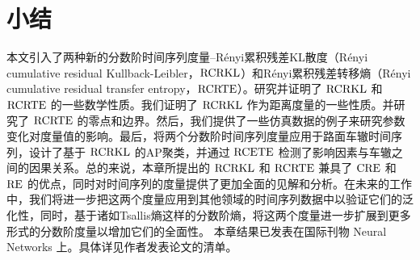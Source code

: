\section{小结} 
本文引入了两种新的分数阶时间序列度量--R\'{e}nyi累积残差KL散度（R\'{e}nyi cumulative residual Kullback-Leibler，$\rm{RCRKL}$）和R\'{e}nyi累积残差转移熵（R\'{e}nyi cumulative residual transfer entropy，$\rm{RCRTE}$）。研究并证明了 $\rm{RCRKL}$ 和 $\rm{RCRTE}$ 的一些数学性质。我们证明了 $\rm{RCRKL}$ 作为距离度量的一些性质。并研究了 $\rm{RCRTE}$ 的零点和边界。然后，我们提供了一些仿真数据的例子来研究参数变化对度量值的影响。最后，将两个分数阶时间序列度量应用于路面车辙时间序列，设计了基于 $\rm{RCRKL}$ 的AP聚类，并通过 $\rm{RCETE}$ 检测了影响因素与车辙之间的因果关系。总的来说，本章所提出的 $\rm{RCRKL}$ 和 $\rm{RCRTE}$ 兼具了 $\rm{CRE}$ 和 $\rm{RE}$ 的优点，同时对时间序列的度量提供了更加全面的见解和分析。在未来的工作中，我们将进一步把这两个度量应用到其他领域的时间序列数据中以验证它们的泛化性，同时，基于诸如Tsallis熵这样的分数阶熵，将这两个度量进一步扩展到更多形式的分数阶度量以增加它们的全面性。
本章结果已发表在国际刊物  Neural Networks 上。具体详见作者发表论文的清单。
